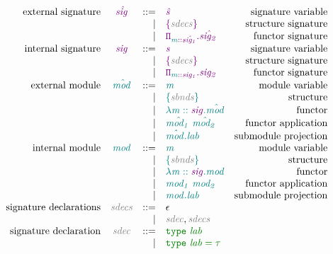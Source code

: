 \documentclass[12pt,fleqn]{article}
\newcommand{\green}[1]{\textcolor{green}{#1}}
\newcommand{\purple}[1]{\textcolor{purple}{#1}}
\newcommand{\teal}[1]{\textcolor{teal}{#1}}
\newcommand{\grey}[1]{\textcolor{grey}{#1}}
\newcommand{\greentt}[1]{\green{\mathtt{#1}}}
\newcommand{\purplett}[1]{\purple{\mathtt{#1}}}
\newcommand{\tealtt}[1]{\teal{\mathtt{#1}}}
\newcommand{\greenit}[1]{\green{\mathit{#1}}}
\newcommand{\purpleit}[1]{\purple{\mathit{#1}}}
\newcommand{\tealit}[1]{\teal{\mathit{#1}}}
\newcommand{\greyit}[1]{\grey{\mathit{#1}}}
\newcommand{\typ}[1][]{\greenit{\tau#1}}
\newcommand{\usig}[1][]{\purpleit{\hat{sig#1}}}
\newcommand{\sig}[1][]{\purpleit{sig#1}}
\newcommand{\usigvar}[1][]{\purpleit{\hat{s#1}}}
\newcommand{\sigvar}[1][]{\purpleit{s#1}}
\newcommand{\umod}[1][]{\tealit{\hat{mod#1}}}
\renewcommand{\mod}[1][]{\tealit{mod#1}}
\newcommand{\umodvar}[1][]{\tealit{m#1}}
\newcommand{\modvar}[1][]{\tealit{m#1}}
\newcommand{\lab}[1][]{\mathit{lab#1}}
\newcommand{\Sig}[1]{\purplett{\{#1\}}}
\newcommand{\FunctorSig}[2]{\purplett{\Pi_{#1}.{#2}}}
\newcommand{\Struct}[1]{\tealtt{\{#1\}}}
\newcommand{\Functor}[2]{\tealtt{\lambda #1.#2}}
\newcommand{\FunctorAp}[2]{\tealtt{#1~#2}}
\newcommand{\SubModulePrj}[2]{\tealtt{#1.#2}}
\newcommand{\sbnds}{\greyit{sbnds}}
\newcommand{\sdec}{\greyit{sdec}}
\newcommand{\sdecs}{\greyit{sdecs}}
\begin{document}
\[\begin{array}{rcrlr}
    \textrm{external signature} & \usig & ::=
                       & \usigvar & \textrm{signature variable} \\
                       && \vert & \Sig{\sdecs} & \textrm{structure signature} \\
                       && \vert & \FunctorSig{\modvar::\usig[_1]}{\usig[_2]} & \textrm{functor signature} \\
    \textrm{internal signature} & \sig & ::=
                       & \sigvar & \textrm{signature variable} \\
                       && \vert & \Sig{\sdecs} & \textrm{structure signature} \\
                       && \vert & \FunctorSig{\modvar::\sig[_1]}{\sig[_2]} & \textrm{functor signature} \\
    \textrm{external module} & \umod & ::=
                    & \umodvar & \textrm{module variable} \\
                    && \vert & \Struct{\sbnds} & \textrm{structure} \\
                    && \vert & \Functor{\umodvar::\sig}{\umod} & \textrm{functor} \\
                    && \vert & \FunctorAp{\umod[_1]}{\umod[_2]} & \textrm{functor application} \\
                    && \vert & \SubModulePrj{\umod}{\lab} & \textrm{submodule projection} \\
    \textrm{internal module} & \mod & ::=
                    & \modvar & \textrm{module variable} \\
                    && \vert & \Struct{\sbnds} & \textrm{structure} \\
                    && \vert & \Functor{\modvar::\sig}{\mod} & \textrm{functor} \\
                    && \vert & \FunctorAp{\mod[_1]}{\mod[_2]} & \textrm{functor application} \\
                    && \vert & \SubModulePrj{\mod}{\lab} & \textrm{submodule projection} \\
    \textrm{signature declarations} & \sdecs & ::=
                                & \epsilon \\
                                && \vert & \sdec,\sdecs\\
    \textrm{signature declaration} & \sdec & ::=
                                   & \greentt{type~\lab} \\
                                   && \vert & \greentt{type~\lab = \typ} \\

\end{array}\]
\end{document}
